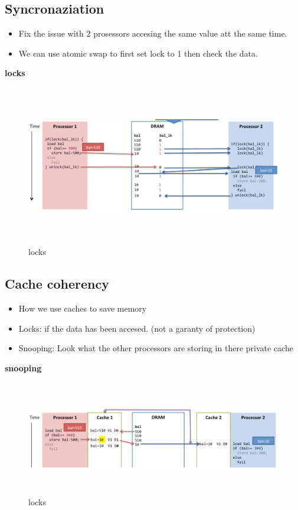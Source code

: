 \documentclass{article}
\begin{document}
\subsection{Syncronaziation}
\begin{itemize}
\item  Fix the issue with 2 prosessors accesing the same value att the same time.
\item  We can use atomic swap to first set lock to 1 then check the data.
\end{itemize}

\newpage

\textbf{locks}
\begin{figure}[h]
    \vspace{10mm}
    \centering
    \includegraphics[width=16cm, height=7cm]{image/locks.png}
    \caption{locks}
\end{figure}


\subsection{Cache coherency}
\begin{itemize}
\item  How we use caches to save memory
\item  Locks: if the data has been accesed. (not a garanty of protection)
\item  Snooping: Look what the other processors are storing in there private cache   
\end{itemize}
  

\textbf{snooping}
\begin{figure}[h]
    \vspace{10mm}
    \centering
    \includegraphics[width=16cm, height=5cm]{image/snooping.png}
    \caption{locks}
\end{figure}
\end{document}
